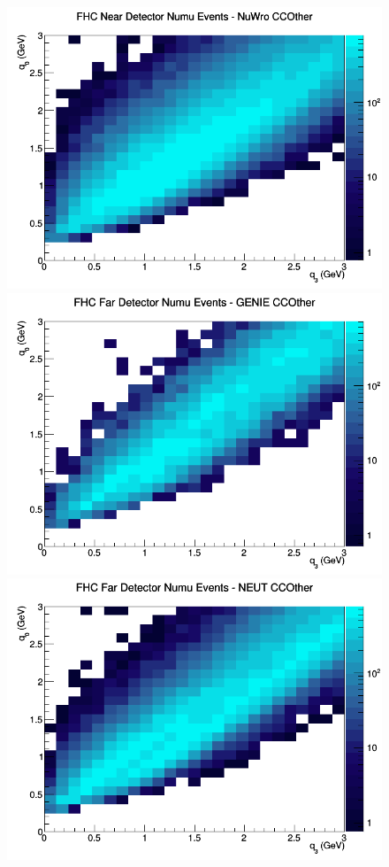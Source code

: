 \documentclass[12pt]{article}
\begin{document}
\begin{figure}[h]
\includegraphics[width=\linewidth]{eff_q0_q3/LAr/CCOther_FHC_ND_numu_q3_q0_NuWro.png}
\endminipage
\newline
{}
\includegraphics[width=\linewidth]{eff_q0_q3/LAr/CCOther_FHC_FD_numu_q3_q0_GENIE.png}
\endminipage
{}
\includegraphics[width=\linewidth]{eff_q0_q3/LAr/CCOther_FHC_FD_numu_q3_q0_NEUT.png}

\end{figure}
\end{document}
